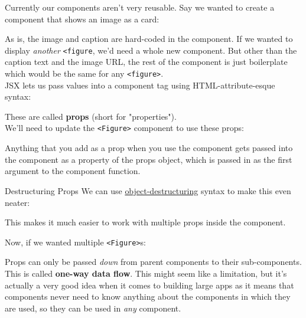 Currently our components aren't very reusable. Say we wanted to create a component that shows an image as a card:


As is, the image and caption are hard-coded in the component. If we wanted to display \textit{another} \texttt{<figure}, we'd need a whole new component. But other than the caption text and the image URL, the rest of the component is just boilerplate which would be the same for any \texttt{<figure>}.
\\

JSX lets us pass values into a component tag using HTML-attribute-esque syntax:


These are called \textbf{props} (short for "properties").
\\

We'll need to update the \texttt{<Figure>} component to use these props:


Anything that you add as a prop when you use the component gets passed into the component as a property of the props object, which is passed in as the first argument to the component function.

\begin{infobox}{Destructuring Props}
    We can use \href{https://developer.mozilla.org/en-US/docs/Web/JavaScript/Reference/Operators/Destructuring_assignment}{object-destructuring} syntax to make this even neater:


    This makes it much easier to work with multiple props inside the component.
\end{infobox}

Now, if we wanted multiple \texttt{<Figure>}s:


Props can only be passed \textit{down} from parent components to their sub-components. This is called \textbf{one-way data flow}. This might seem like a limitation, but it's actually a very good idea when it comes to building large apps as it means that components never need to know anything about the components in which they are used, so they can be used in \textit{any} component.
\\


